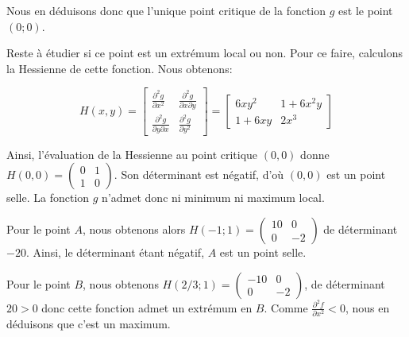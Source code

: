 {\begin{enumerate}
{Nous en déduisons donc que l'unique point critique de la fonction $g$ est le point $(0;0)$.

Reste à étudier si ce point est un extrémum local ou non.  
Pour ce faire, calculons la Hessienne de cette fonction. Nous obtenons:

\[
H(x,y) = \begin{bmatrix}
\frac{\partial^2 g}{\partial x^2} & \frac{\partial^2 g}{\partial x \partial y} \\
\frac{\partial^2 g}{\partial y \partial x} & \frac{\partial^2 g}{\partial y^2}
\end{bmatrix}
=
\begin{bmatrix}
6xy^2 & 1+6x^2y \\
1+6xy & 2x^3  
\end{bmatrix}
\]

Ainsi, l'évaluation de la Hessienne au point critique $(0,0)$ donne $H(0,0)=\begin{pmatrix} 0  & 1\\ 1&0\end{pmatrix}$. Son déterminant est négatif, d'où $(0,0)$ est un point selle. 
La fonction $g$ n'admet donc ni minimum ni maximum local. 

Pour le point $A$, nous obtenons alors $H(-1;1)= \begin{pmatrix} 10 & 0 \\ 0 & -2\end{pmatrix}$ de déterminant 
$-20$. Ainsi, le déterminant étant négatif, $A$ est un point selle. 

Pour le point $B$, nous obtenons 
$H(2/3;1) = \begin{pmatrix} -10 & 0 \\ 0 & -2\end{pmatrix}$, de déterminant $20>0$ donc cette fonction admet un extrémum en $B$.  Comme $\frac{\partial^2 f}{\partial x^2}<0$, nous en déduisons que c'est un maximum. 



}
\end{enumerate}
} 